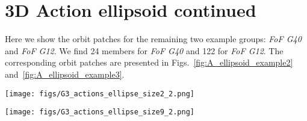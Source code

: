 \documentclass[twocolumn]{aastex631}
\begin{document}



\appendix
\section{3D Action ellipsoid continued}
Here we show the orbit patches for the remaining two example groups: \textit{FoF G40} and \textit{FoF G12}. We find 24 members for \textit{FoF G40} and 122 for \textit{FoF G12}. The corresponding orbit patches are presented in Figs.~\ref{fig:A_ellipsoid_example2} and~\ref{fig:A_ellipsoid_example3}. 

\begin{figure*}
\begin{center}
\texttt{[image: figs/G3\_actions\_ellipse\_size2\_2.png]}
\caption{Action distribution ($J_{R}, J_{z}, J_{\phi}$) for the entire GEDR3-RVS selection and the \textit{FoF G40} orbit patch. With yellow dots we show the orbit patch selection and in grey dots we show the group members. The upper right inset in each panel shows a zoom-in into the orbit patch to highlight clearly its size and also how well this method encloses the group.}
\label{fig:A_ellipsoid_example2}
\end{center}
\end{figure*}

\begin{figure*}
\begin{center}
\texttt{[image: figs/G3\_actions\_ellipse\_size9\_2.png]}
\caption{Action distribution ($J_{R}, J_{z}, J_{\phi}$) for the entire GEDR3-RVS selection and the \textit{FoF G12} orbit patch. With yellow dots we show the orbit patch selection and in grey dots we show the group members. The upper right inset in each panel shows a zoom-in into the orbit patch to highlight clearly its size and also how well this method encloses the group.}
\label{fig:A_ellipsoid_example3}
\end{center}
\end{figure*}
\end{document}
